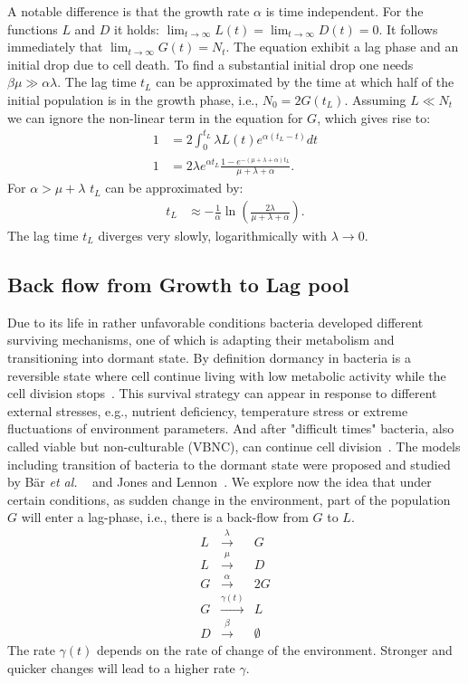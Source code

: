 \documentclass[10pt,A4paper]{article}
\numberwithin{equation}{section}
\newcommand{\etal}{{\textit{et al. }}}
\begin{document}
A notable difference is that the growth rate $\alpha$ is time independent.
For the functions $L$ and $D$ it holds: $\lim_{t\to\infty} L(t) = \lim_{t\to\infty} D(t) = 0$.
It follows immediately that $\lim_{t\to\infty} G(t) = N_t$.
The equation exhibit a lag phase and an initial drop due to cell death.
To find a substantial initial drop one needs $\beta \mu \gg \alpha \lambda$.
The lag time $t_L$ can be approximated by the time at which half of the initial population is in the growth phase, i.e., $N_0=2G(t_L)$.
Assuming $L\ll N_t$ we can ignore the non-linear term in the equation for $G$, which gives rise to:
\begin{align}
    1&= 2\int_0^{t_L} \lambda L(t)e^{\alpha(t_L-t)}dt\\
    1  &= 2\lambda e^{\alpha t_L}\frac{1-e^{-(\mu+\lambda+\alpha)t_L}}{\mu+\lambda+\alpha}.
\end{align}
For $\alpha > \mu+\lambda$ $t_L$ can be approximated by:
\begin{align}
    t_L &\approx -\frac{1}{\alpha}\ln\left(\frac{2\lambda}{\mu+\lambda+\alpha}\right).
\end{align}
The lag time $t_L$ diverges very slowly, logarithmically with $\lambda\to 0$.
%
%
%
\subsection{Back flow from Growth to Lag pool}
Due to its life in rather unfavorable conditions bacteria developed different surviving mechanisms, one of which is adapting their metabolism and transitioning into dormant state.
By definition dormancy in bacteria is a reversible state where cell continue living with low metabolic activity while the cell division stops~\cite{kaprelyants_dormancy_1993}.
This survival strategy can appear in response to different external stresses, e.g., nutrient deficiency, temperature stress or extreme fluctuations of environment parameters.
And after "difficult times" bacteria, also called viable but non-culturable (VBNC), can continue cell division~\cite{kell_viability_1998}.
The models including transition of bacteria to the dormant state were proposed and studied by Bär \etal~\cite{bar_modelling_2002} and Jones and Lennon~\cite{jones_dormancy_2010}.
%
We explore now the idea that under certain conditions, as sudden change in the environment, part of the population $G$ will enter a lag-phase, i.e., there is a back-flow from $G$ to $L$.
\begin{eqnarray}
    L &\stackrel{\lambda}{\longrightarrow} & G\\
    L &\stackrel{\mu}{\longrightarrow} & D\\
    G &\stackrel{\alpha}{\longrightarrow} & 2G\\
    G &\stackrel{\gamma(t)}{\longrightarrow} & L\\
    D &\stackrel{\beta}{\longrightarrow} & \emptyset
\end{eqnarray}
The rate $\gamma(t)$ depends on the rate of change of the environment.
Stronger and quicker changes will lead to a higher rate $\gamma$.
%
%
\end{document}
